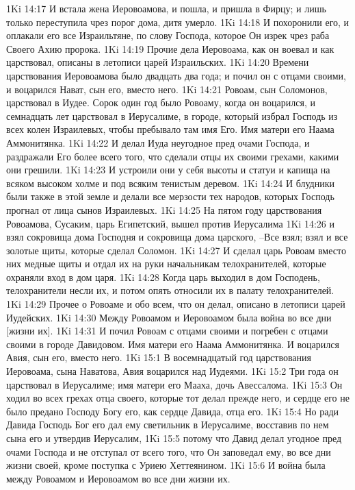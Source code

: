 1Ki 14:17  И встала жена Иеровоамова, и пошла, и пришла в Фирцу; и лишь только переступила чрез порог дома, дитя умерло.
1Ki 14:18  И похоронили его, и оплакали его все Израильтяне, по слову Господа, которое Он изрек чрез раба Своего Ахию пророка.
1Ki 14:19  Прочие дела Иеровоама, как он воевал и как царствовал, описаны в летописи царей Израильских.
1Ki 14:20  Времени царствования Иеровоамова было двадцать два года; и почил он с отцами своими, и воцарился Нават, сын его, вместо него.
1Ki 14:21  Ровоам, сын Соломонов, царствовал в Иудее. Сорок один год было Ровоаму, когда он воцарился, и семнадцать лет царствовал в Иерусалиме, в городе, который избрал Господь из всех колен Израилевых, чтобы пребывало там имя Его. Имя матери его Наама Аммонитянка.
1Ki 14:22  И делал Иуда неугодное пред очами Господа, и раздражали Его более всего того, что сделали отцы их своими грехами, какими они грешили.
1Ki 14:23  И устроили они у себя высоты и статуи и капища на всяком высоком холме и под всяким тенистым деревом.
1Ki 14:24  И блудники были также в этой земле и делали все мерзости тех народов, которых Господь прогнал от лица сынов Израилевых.
1Ki 14:25  На пятом году царствования Ровоамова, Сусаким, царь Египетский, вышел против Иерусалима
1Ki 14:26  и взял сокровища дома Господня и сокровища дома царского, --Все взял; взял и все золотые щиты, которые сделал Соломон.
1Ki 14:27  И сделал царь Ровоам вместо них медные щиты и отдал их на руки начальникам телохранителей, которые охраняли вход в дом царя.
1Ki 14:28  Когда царь выходил в дом Господень, телохранители несли их, и потом опять относили их в палату телохранителей.
1Ki 14:29  Прочее о Ровоаме и обо всем, что он делал, описано в летописи царей Иудейских.
1Ki 14:30  Между Ровоамом и Иеровоамом была война во все дни [жизни их].
1Ki 14:31  И почил Ровоам с отцами своими и погребен с отцами своими в городе Давидовом. Имя матери его Наама Аммонитянка. И воцарился Авия, сын его, вместо него.
1Ki 15:1  В восемнадцатый год царствования Иеровоама, сына Наватова, Авия воцарился над Иудеями.
1Ki 15:2  Три года он царствовал в Иерусалиме; имя матери его Мааха, дочь Авессалома.
1Ki 15:3  Он ходил во всех грехах отца своего, которые тот делал прежде него, и сердце его не было предано Господу Богу его, как сердце Давида, отца его.
1Ki 15:4  Но ради Давида Господь Бог его дал ему светильник в Иерусалиме, восставив по нем сына его и утвердив Иерусалим,
1Ki 15:5  потому что Давид делал угодное пред очами Господа и не отступал от всего того, что Он заповедал ему, во все дни жизни своей, кроме поступка с Уриею Хеттеянином.
1Ki 15:6  И война была между Ровоамом и Иеровоамом во все дни жизни их.

